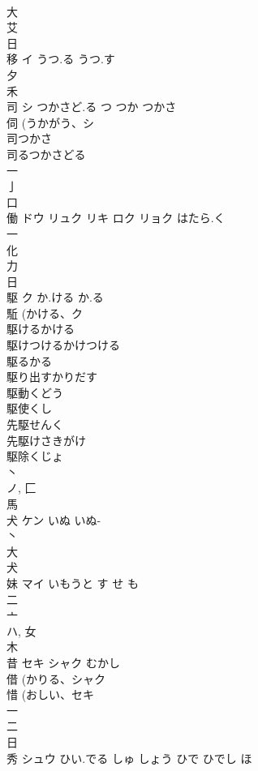 \documentclass[8pt]{extreport}
\begin{document}
\begin{CJK}{UTF8}{min}
\\	大 
\\	艾 
\\	日 
\\	移	イ	うつ.る うつ.す	
\\	夕 
\\	禾 
\\	司	シ	つかさど.る つ つか つかさ	
\\	伺 (うかがう、シ 
\\	司つかさ
\\	司るつかさどる
\\	一 
\\	亅 
\\	口 
\\	働	ドウ リュク リキ ロク リョク	はたら.く	
\\	一 
\\	化 
\\	力 
\\	日 
\\	駆	ク	か.ける か.る	
\\	駈 (かける、ク 
\\	駆けるかける 
\\	駆けつけるかけつける 
\\	駆るかる 
\\	駆り出すかりだす 
\\	駆動くどう 
\\	駆使くし 
\\	先駆せんく 
\\	先駆けさきがけ 
\\	駆除くじょ 
\\	丶 
\\	ノ, 匚 
\\	馬 
\\	犬	ケン	いぬ いぬ-	
\\	丶 
\\	大 
\\	犬 
\\	妹	マイ	いもうと す せ も	
\\	二 
\\	亠 
\\	ハ, 女 
\\	木 
\\	昔	セキ シャク	むかし	
\\	借 (かりる、シャク 
\\	惜 (おしい、セキ 
\\	一 
\\	二 
\\	日 
\\	秀	シュウ	ひい.でる しゅ しょう ひで ひでし ほ	

\end{CJK}
\end{document}
